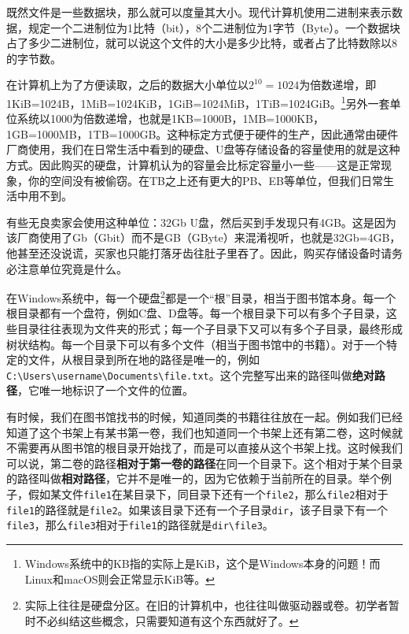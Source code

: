 既然文件是一些数据块，那么就可以度量其大小。现代计算机使用二进制来表示数据，规定一个二进制位为1比特（bit），8个二进制位为1字节（Byte）。一个数据块占了多少二进制位，就可以说这个文件的大小是多少比特，或者占了比特数除以8的字节数。

在计算机上为了方便读取，之后的数据大小单位以$2^{10}=1024$为倍数递增，即1KiB=1024B，1MiB=1024KiB，1GiB=1024MiB，1TiB=1024GiB。\footnote{Windows系统中的KB指的实际上是KiB，这个是Windows本身的问题！而Linux和macOS则会正常显示KiB等。}另外一套单位系统以1000为倍数递增，也就是1KB=1000B，1MB=1000KB，1GB=1000MB，1TB=1000GB。这种标定方式便于硬件的生产，因此通常由硬件厂商使用，我们在日常生活中看到的硬盘、U盘等存储设备的容量使用的就是这种方式。因此购买的硬盘，计算机认为的容量会比标定容量小一些——这是正常现象，你的空间没有被偷窃。在TB之上还有更大的PB、EB等单位，但我们日常生活中用不到。

\begin{caution}
  有些无良卖家会使用这种单位：32Gb U盘，然后买到手发现只有4GB。这是因为该厂商使用了Gb（Gbit）而不是GB（GByte）来混淆视听，也就是32Gb=4GB，他甚至还没说谎，买家也只能打落牙齿往肚子里吞了。因此，购买存储设备时请务必注意单位究竟是什么。
\end{caution}

在Windows系统中，每一个硬盘\footnote{实际上往往是硬盘分区。在旧的计算机中，也往往叫做驱动器或卷。初学者暂时不必纠结这些概念，只需要知道有这个东西就好了。}都是一个“根”目录，相当于图书馆本身。每一个根目录都有一个盘符，例如C盘、D盘等。每一个根目录下可以有多个子目录，这些目录往往表现为文件夹的形式；每一个子目录下又可以有多个子目录，最终形成树状结构。每一个目录下可以有多个文件（相当于图书馆中的书籍）。对于一个特定的文件，从根目录到所在地的路径是唯一的，例如\texttt{C:\textbackslash Users\textbackslash username\textbackslash Documents\textbackslash file.txt}。这个完整写出来的路径叫做\textbf{绝对路径}，它唯一地标识了一个文件的位置。

有时候，我们在图书馆找书的时候，知道同类的书籍往往放在一起。例如我们已经知道了这个书架上有某书第一卷，我们也知道同一个书架上还有第二卷，这时候就不需要再从图书馆的根目录开始找了，而是可以直接从这个书架上找。这时候我们可以说，第二卷的路径\textbf{相对于第一卷的路径}在同一个目录下。这个相对于某个目录的路径叫做\textbf{相对路径}，它并不是唯一的，因为它依赖于当前所在的目录。举个例子，假如某文件\texttt{file1}在某目录下，同目录下还有一个\texttt{file2}，那么\texttt{file2}相对于\texttt{file1}的路径就是\texttt{file2}。如果该目录下还有一个子目录\texttt{dir}，该子目录下有一个\texttt{file3}，那么\texttt{file3}相对于\texttt{file1}的路径就是\texttt{dir\textbackslash file3}。

